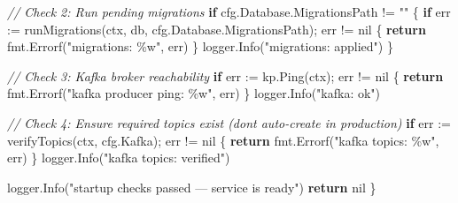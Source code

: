 \documentclass[
]{article}
\newenvironment{Shaded}{}{}
\newcommand{\CommentTok}[1]{\textcolor[rgb]{0.38,0.63,0.69}{\textit{#1}}}
\newcommand{\ControlFlowTok}[1]{\textcolor[rgb]{0.00,0.44,0.13}{\textbf{#1}}}
\newcommand{\NormalTok}[1]{#1}
\newcommand{\OperatorTok}[1]{\textcolor[rgb]{0.40,0.40,0.40}{#1}}
\newcommand{\OtherTok}[1]{\textcolor[rgb]{0.00,0.44,0.13}{#1}}
\newcommand{\StringTok}[1]{\textcolor[rgb]{0.25,0.44,0.63}{#1}}
\begin{document}
\begin{Shaded}
\begin{Highlighting}[]
    \CommentTok{// Check 2: Run pending migrations}
    \ControlFlowTok{if}\NormalTok{ cfg}\OperatorTok{.}\NormalTok{Database}\OperatorTok{.}\NormalTok{MigrationsPath }\OperatorTok{!=} \StringTok{""} \OperatorTok{\{}
        \ControlFlowTok{if}\NormalTok{ err }\OperatorTok{:=}\NormalTok{ runMigrations}\OperatorTok{(}\NormalTok{ctx}\OperatorTok{,}\NormalTok{ db}\OperatorTok{,}\NormalTok{ cfg}\OperatorTok{.}\NormalTok{Database}\OperatorTok{.}\NormalTok{MigrationsPath}\OperatorTok{);}\NormalTok{ err }\OperatorTok{!=} \OtherTok{nil} \OperatorTok{\{}
            \ControlFlowTok{return}\NormalTok{ fmt}\OperatorTok{.}\NormalTok{Errorf}\OperatorTok{(}\StringTok{"migrations: \%w"}\OperatorTok{,}\NormalTok{ err}\OperatorTok{)}
        \OperatorTok{\}}
\NormalTok{        logger}\OperatorTok{.}\NormalTok{Info}\OperatorTok{(}\StringTok{"migrations: applied"}\OperatorTok{)}
    \OperatorTok{\}}

    \CommentTok{// Check 3: Kafka broker reachability}
    \ControlFlowTok{if}\NormalTok{ err }\OperatorTok{:=}\NormalTok{ kp}\OperatorTok{.}\NormalTok{Ping}\OperatorTok{(}\NormalTok{ctx}\OperatorTok{);}\NormalTok{ err }\OperatorTok{!=} \OtherTok{nil} \OperatorTok{\{}
        \ControlFlowTok{return}\NormalTok{ fmt}\OperatorTok{.}\NormalTok{Errorf}\OperatorTok{(}\StringTok{"kafka producer ping: \%w"}\OperatorTok{,}\NormalTok{ err}\OperatorTok{)}
    \OperatorTok{\}}
\NormalTok{    logger}\OperatorTok{.}\NormalTok{Info}\OperatorTok{(}\StringTok{"kafka: ok"}\OperatorTok{)}

    \CommentTok{// Check 4: Ensure required topics exist (don\textquotesingle{}t auto{-}create in production)}
    \ControlFlowTok{if}\NormalTok{ err }\OperatorTok{:=}\NormalTok{ verifyTopics}\OperatorTok{(}\NormalTok{ctx}\OperatorTok{,}\NormalTok{ cfg}\OperatorTok{.}\NormalTok{Kafka}\OperatorTok{);}\NormalTok{ err }\OperatorTok{!=} \OtherTok{nil} \OperatorTok{\{}
        \ControlFlowTok{return}\NormalTok{ fmt}\OperatorTok{.}\NormalTok{Errorf}\OperatorTok{(}\StringTok{"kafka topics: \%w"}\OperatorTok{,}\NormalTok{ err}\OperatorTok{)}
    \OperatorTok{\}}
\NormalTok{    logger}\OperatorTok{.}\NormalTok{Info}\OperatorTok{(}\StringTok{"kafka topics: verified"}\OperatorTok{)}

\NormalTok{    logger}\OperatorTok{.}\NormalTok{Info}\OperatorTok{(}\StringTok{"startup checks passed — service is ready"}\OperatorTok{)}
    \ControlFlowTok{return} \OtherTok{nil}
\OperatorTok{\}}
\end{Highlighting}
\end{Shaded}
\end{document}
